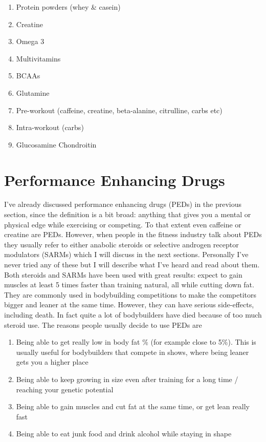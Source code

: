 \documentclass[openany, 12pt]{book}
\begin{document}
	\begin{enumerate}
		\item Protein powders (whey \& casein)
		\item Creatine
		\item Omega 3
		\item Multivitamins
		\item BCAAs
		\item Glutamine
		\item Pre-workout (caffeine, creatine, beta-alanine, citrulline, carbs etc)
		\item Intra-workout (carbs)
		\item Glucosamine Chondroitin
	\end{enumerate}

        \section{Performance Enhancing Drugs}

        I've already discussed performance enhancing drugs (PEDs) in the previous section, since the definition is a bit broad: anything that gives you a mental or physical edge while exercising or
        competing. To that extent even caffeine or creatine are PEDs. However, when people in the fitness industry talk about PEDs they usually refer to either anabolic steroids or selective androgen
        receptor modulators (SARMs) which I will discuss in the next sections. Personally I've never tried any of these but I will describe what I've heard and read about them.
        Both steroids and SARMs have been used with great results: expect to gain muscles at least 5 times faster than training natural, all while cutting down fat.
        They are commonly used in bodybuilding competitions to make the competitors bigger and leaner at the same time. However, they can have serious side-effects, including death. In fact quite a lot
        of bodybuilders have died because of too much steroid use.
        The reasons people usually decide to use PEDs are

	\begin{enumerate}
		\item Being able to get really low in body fat \% (for example close to 5\%). This is usually useful for bodybuilders that compete in shows, where being leaner gets you a higher place
		\item Being able to keep growing in size even after training for a long time / reaching your genetic potential
		\item Being able to gain muscles and cut fat at the same time, or get lean really fast
		\item Being able to eat junk food and drink alcohol while staying in shape
	\end{enumerate}
\end{document}
